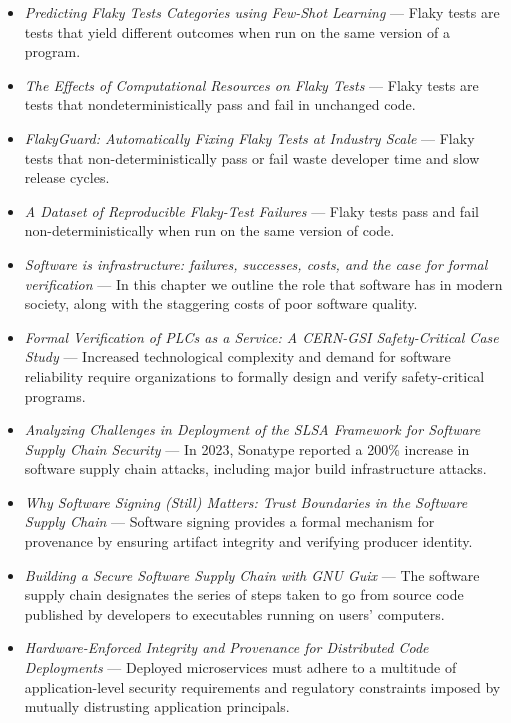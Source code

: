 \documentclass[11pt,a4paper]{article}
\providecommand{\textcite}[1]{\cite{#1}}
\begin{document}
\begin{itemize}[leftmargin=1.3em,itemsep=2pt]
\item \textcite{arxiv2208_14799} \emph{Predicting Flaky Tests Categories using Few-Shot Learning} --- Flaky tests are tests that yield different outcomes when run on the same version of a program.
\item \textcite{arxiv2310_12132} \emph{The Effects of Computational Resources on Flaky Tests} --- Flaky tests are tests that nondeterministically pass and fail in unchanged code.
\item \textcite{arxiv2511_14002} \emph{FlakyGuard: Automatically Fixing Flaky Tests at Industry Scale} --- Flaky tests that non-deterministically pass or fail waste developer time and slow release cycles.
\item \textcite{arxiv2605_21677} \emph{A Dataset of Reproducible Flaky-Test Failures} --- Flaky tests pass and fail non-deterministically when run on the same version of code.
\item \textcite{arxiv2506_13821} \emph{Software is infrastructure: failures, successes, costs, and the case for formal verification} --- In this chapter we outline the role that software has in modern society, along with the staggering costs of poor software quality.
\item \textcite{arxiv2502_19150} \emph{Formal Verification of PLCs as a Service: A CERN-GSI Safety-Critical Case Study} --- Increased technological complexity and demand for software reliability require organizations to formally design and verify safety-critical programs.
\item \textcite{arxiv2409_05014} \emph{Analyzing Challenges in Deployment of the SLSA Framework for Software Supply Chain Security} --- In 2023, Sonatype reported a 200\% increase in software supply chain attacks, including major build infrastructure attacks.
\item \textcite{arxiv2510_04964} \emph{Why Software Signing (Still) Matters: Trust Boundaries in the Software Supply Chain} --- Software signing provides a formal mechanism for provenance by ensuring artifact integrity and verifying producer identity.
\item \textcite{arxiv2206_14606} \emph{Building a Secure Software Supply Chain with GNU Guix} --- The software supply chain designates the series of steps taken to go from source code published by developers to executables running on users' computers.
\item \textcite{arxiv2106_09843} \emph{Hardware-Enforced Integrity and Provenance for Distributed Code Deployments} --- Deployed microservices must adhere to a multitude of application-level security requirements and regulatory constraints imposed by mutually distrusting application principals.

\end{itemize}
\end{document}
